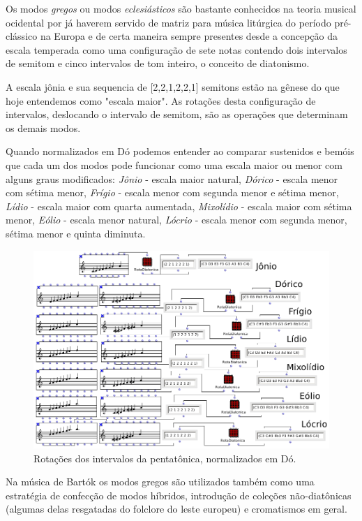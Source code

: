 \documentclass[
	12pt,				%
	openright,			%
	twoside,			%
	a4paper,			%
	english,			%
	french,				%
	spanish,			%
	brazil				%
	]{abntex2}
\begin{document}
Os modos \textit{gregos} ou modos \textit{eclesiásticos} são bastante conhecidos na teoria musical ocidental por já haverem servido de matriz para música litúrgica do período pré-clássico na Europa e de certa maneira sempre presentes desde a concepção da escala temperada como uma configuração de sete notas contendo dois intervalos de semitom e cinco intervalos de tom inteiro, o conceito de diatonismo. 

A escala jônia e sua sequencia de [2,2,1,2,2,1] semitons estão na gênese do que hoje entendemos como "escala maior". As rotações desta configuração de intervalos, deslocando o intervalo de semitom, são as operações que determinam os demais modos. 

Quando normalizados em Dó podemos entender ao comparar sustenidos e bemóis que cada um dos modos pode funcionar como uma escala maior ou menor com alguns graus modificados: \textit{Jônio} - escala maior natural, \textit{Dórico} -   escala menor com sétima menor, \textit{Frígio} - escala menor com segunda menor e sétima menor, \textit{Lídio} - escala maior com quarta aumentada, \textit{Mixolídio} - escala maior com sétima menor, \textit{Eólio} - escala menor natural, \textit{Lócrio} - escala menor com segunda menor, sétima menor e quinta diminuta.

\begin{figure}[!h]
	\caption{\label{fig_grafico}Rotações dos intervalos da pentatônica, normalizados em Dó. }
	\begin{center}
	    \includegraphics[scale=0.5]{modal/modal.png}
	\end{center}
\end{figure}


Na música de Bartók os modos gregos são utilizados também como uma estratégia de confecção de modos híbridos, introdução de coleções não-diatônicas (algumas delas resgatadas do folclore do leste europeu) e cromatismos em geral.
\end{document}
